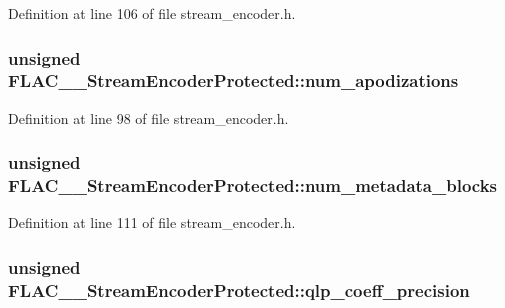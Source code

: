 Definition at line 106 of file stream\+\_\+encoder.\+h.

\subsubsection[{\texorpdfstring{num\+\_\+apodizations}{num_apodizations}}]{\setlength{\rightskip}{0pt plus 5cm}unsigned F\+L\+A\+C\+\_\+\+\_\+\+Stream\+Encoder\+Protected\+::num\+\_\+apodizations}\hypertarget{struct_f_l_a_c_____stream_encoder_protected_adf2b6a72c1b6ba822ffef7b0662c60d3}{}\label{struct_f_l_a_c_____stream_encoder_protected_adf2b6a72c1b6ba822ffef7b0662c60d3}


Definition at line 98 of file stream\+\_\+encoder.\+h.

\subsubsection[{\texorpdfstring{num\+\_\+metadata\+\_\+blocks}{num_metadata_blocks}}]{\setlength{\rightskip}{0pt plus 5cm}unsigned F\+L\+A\+C\+\_\+\+\_\+\+Stream\+Encoder\+Protected\+::num\+\_\+metadata\+\_\+blocks}\hypertarget{struct_f_l_a_c_____stream_encoder_protected_aae37d8bd0ff9bf84b263523b7a00032b}{}\label{struct_f_l_a_c_____stream_encoder_protected_aae37d8bd0ff9bf84b263523b7a00032b}


Definition at line 111 of file stream\+\_\+encoder.\+h.

\subsubsection[{\texorpdfstring{qlp\+\_\+coeff\+\_\+precision}{qlp_coeff_precision}}]{\setlength{\rightskip}{0pt plus 5cm}unsigned F\+L\+A\+C\+\_\+\+\_\+\+Stream\+Encoder\+Protected\+::qlp\+\_\+coeff\+\_\+precision}\hypertarget{struct_f_l_a_c_____stream_encoder_protected_ac0032b9d1a6d61f3080b6b1397fabca7}{}\label{struct_f_l_a_c_____stream_encoder_protected_ac0032b9d1a6d61f3080b6b1397fabca7}


